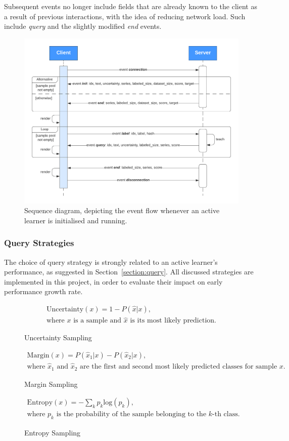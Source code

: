 \documentclass[a4paper,12pt]{article}
\begin{document}
Subsequent events no longer include fields that are already known to the client as a result of previous interactions, with the idea of reducing network load. Such include \emph{query} and the slightly modified \emph{end} events.
\begin{figure}[H]
\centering
    \includegraphics[scale=0.85]{flow_ws.pdf}
\captionsetup{justification=centering}
\caption{\label{fig:modelinteraction}Sequence diagram, depicting the event flow whenever an active learner is initialised and running.}
\end{figure}
\subsubsection{Query Strategies}
The choice of query strategy is strongly related to an active learner's performance, as suggested in Section~\ref{section:query}. All discussed strategies are implemented in this project, in order to evaluate their impact on early performance growth rate.
\begin{figure}[H]
\begin{gather*}
  \text{Uncertainty}(x) = 1 - P(\hat x|x), \\
  \text{where~$x$ is a sample and~$\hat x$ is its most likely prediction.}
\end{gather*}
\caption{Uncertainty Sampling}
\end{figure}
\vspace{-5mm}
\begin{figure}[H]
\begin{gather*}
  \text{Margin}(x) = P(\hat x_1|x) - P(\hat x_2|x), \\
  \text{where~$\hat x_1$ and~$\hat x_2$ are the first and second most likely predicted classes for sample~$x$.}
\end{gather*}
\caption{Margin Sampling}
\end{figure}
\vspace{-5mm}
\begin{figure}[H]
\begin{gather*}
  \text{Entropy}(x) = -\sum_{k}p_k \text{log}(p_k), \\
  \text{where~$p_k$ is the probability of the sample belonging to the~$k$-th class.}
\end{gather*}
\caption{Entropy Sampling}
\end{figure}
\end{document}
